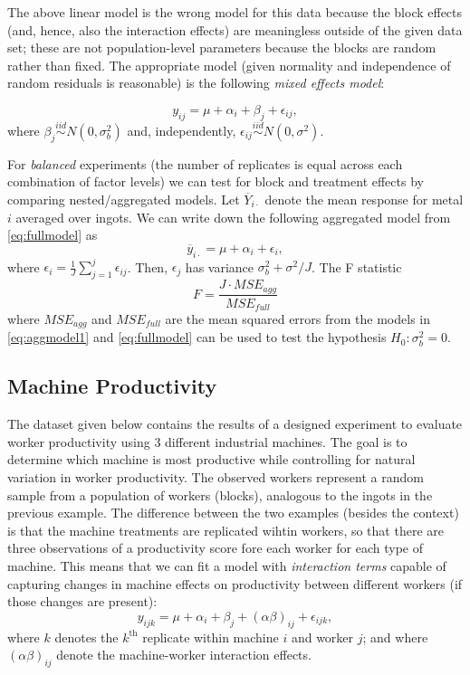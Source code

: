 \documentclass[
]{book}
\begin{document}
The above linear model is the wrong model for this data because the block effects (and, hence, also the interaction effects) are meaningless outside of the given data set; these are not population-level parameters because the blocks are random rather than fixed. The appropriate model (given normality and independence of random residuals is reasonable) is the following \emph{mixed effects model}:

\begin{equation}
y_{ij} = \mu + \alpha_i + \beta_j + \epsilon_{ij},
 \label{eq:fullmodel}
\end{equation}
where \(\beta_j\stackrel{iid}{\sim}N(0, \sigma_b^2)\) and, independently, \(\epsilon_{ij}\stackrel{iid}{\sim}N(0,\sigma^2)\).

For \emph{balanced} experiments (the number of replicates is equal across each combination of factor levels) we can test for block and treatment effects by comparing nested/aggregated models. Let \(\overline Y_{i\cdot}\) denote the mean response for metal \(i\) averaged over ingots. We can write down the following aggregated model from \eqref{eq:fullmodel} as
\begin{equation}
\overline y_{i\cdot} = \mu + \alpha_i + \epsilon_{i},
 \label{eq:aggmodel1}
\end{equation}
where \(\epsilon_i = \frac{1}{J}\sum_{j=1}^j \epsilon_{ij}\). Then, \(\epsilon_j\) has variance \(\sigma_b^2 + \sigma^2/J\). The F statistic
\[F = \frac{J\cdot MSE_{agg}}{MSE_{full}}\]
where \(MSE_{agg}\) and \(MSE_{full}\) are the mean squared errors from the models in \eqref{eq:aggmodel1} and \eqref{eq:fullmodel} can be used to test the hypothesis \(H_0:\sigma_b^2 = 0\).

\hypertarget{machine-productivity}{%
\subsection{Machine Productivity}\label{machine-productivity}}

The dataset given below contains the results of a designed experiment to evaluate worker productivity using 3 different industrial machines. The goal is to determine which machine is most productive while controlling for natural variation in worker productivity. The observed workers represent a random sample from a population of workers (blocks), analogous to the ingots in the previous example. The difference between the two examples (besides the context) is that the machine treatments are replicated wihtin workers, so that there are three observations of a productivity score fore each worker for each type of machine. This means that we can fit a model with \emph{interaction terms} capable of capturing changes in machine effects on productivity between different workers (if those changes are present):
\begin{equation}
y_{ijk} = \mu + \alpha_i + \beta_j + (\alpha\beta)_{ij} + \epsilon_{ijk},
 \label{eq:fullmodel2}
\end{equation}
where \(k\) denotes the \(k^{\text{th}}\) replicate within machine \(i\) and worker \(j\); and where \((\alpha\beta)_{ij}\) denote the machine-worker interaction effects.
\end{document}
